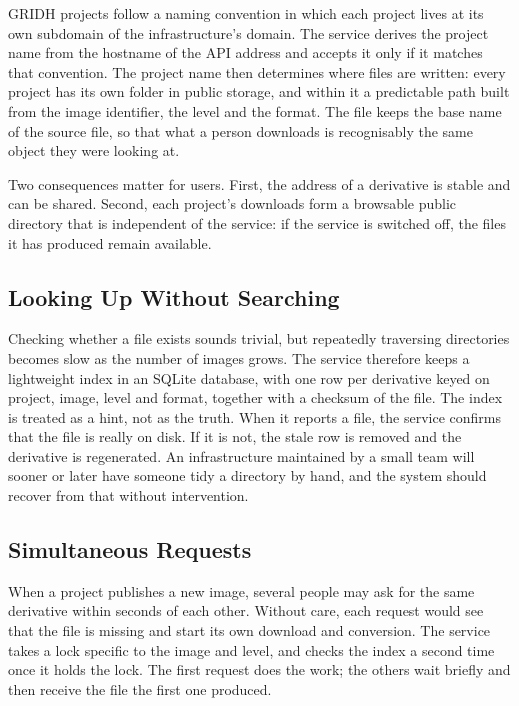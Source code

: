 \documentclass{dhnbpub}
\begin{document}
GRIDH projects follow a naming convention in which each project lives
at its own subdomain of the infrastructure's domain. The service
derives the project name from the hostname of the API address and
accepts it only if it matches that convention. The project name then
determines where files are written: every project has its own folder in
public storage, and within it a predictable path built from the image
identifier, the level and the format. The file keeps the base name of
the source file, so that what a person downloads is recognisably the
same object they were looking at.

Two consequences matter for users. First, the address of a derivative
is stable and can be shared. Second, each project's downloads form a
browsable public directory that is independent of the service: if the
service is switched off, the files it has produced remain available.

\subsection{Looking Up Without Searching}

Checking whether a file exists sounds trivial, but repeatedly
traversing directories becomes slow as the number of images grows. The
service therefore keeps a lightweight index in an SQLite database, with
one row per derivative keyed on project, image, level and format,
together with a checksum of the file. The index is treated as a hint,
not as the truth. When it reports a file, the service confirms that the
file is really on disk. If it is not, the stale row is removed and the
derivative is regenerated. An infrastructure maintained by a small team
will sooner or later have someone tidy a directory by hand, and the
system should recover from that without intervention.

\subsection{Simultaneous Requests}

When a project publishes a new image, several people may ask for the
same derivative within seconds of each other. Without care, each
request would see that the file is missing and start its own download
and conversion. The service takes a lock specific to the image and
level, and checks the index a second time once it holds the lock. The
first request does the work; the others wait briefly and then receive
the file the first one produced.
\end{document}
